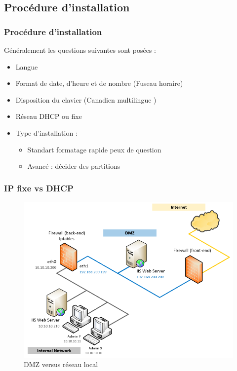 	\subsection{Procédure d'installation}
	\begin{frame}[containsverbatim]
		\frametitle{Procédure d'installation}
		Généralement les questions suivantes sont posées :
		\begin{itemize}
			\item  Langue
			\item Format de date, d’heure et de nombre (Fuseau horaire)
			\item Disposition du clavier (Canadien multilingue )
			\item Réseau DHCP ou fixe
			\item Type d’installation :
			\begin{itemize}
				\item  Standart formatage rapide peux de question
				\item Avancé : décider des partitions
			\end{itemize}
		\end{itemize}
	\end{frame}
	\begin{frame}
		\frametitle{IP fixe vs DHCP}
		\begin{figure}[!htb]
			\centering
			\includegraphics[scale=0.42]{images/dmz}
			\caption{DMZ versus réseau local}
			\label{Fig1}
		\end{figure}
	\end{frame}
